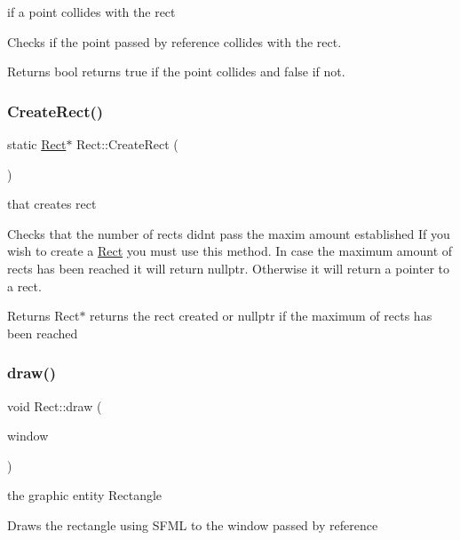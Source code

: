 if a point collides with the rect

Checks if the point passed by reference collides with the rect.

\begin{DoxyReturn}{Returns}
bool returns true if the point collides and false if not. 
\end{DoxyReturn}
\mbox{\label{class_rect_ac9283327c926d453d0cd5a49ded8d150}} 
\subsubsection{\texorpdfstring{Create\+Rect()}{CreateRect()}}
{\footnotesize\ttfamily static \hyperlink{class_rect}{Rect}$\ast$ Rect\+::\+Create\+Rect (\begin{DoxyParamCaption}{ }\end{DoxyParamCaption})\hspace{0.3cm}{\ttfamily [static]}}

that creates rect

Checks that the number of rects didn\textquotesingle{}t pass the maxim amount established If you wish to create a \hyperlink{class_rect}{Rect} you must use this method. In case the maximum amount of rects has been reached it will return nullptr. Otherwise it will return a pointer to a rect.

\begin{DoxyReturn}{Returns}
Rect$\ast$ returns the rect created or nullptr if the maximum of rects has been reached 
\end{DoxyReturn}
\mbox{\label{class_rect_aa131d780f6ebb75e9057c01221486adc}} 
\subsubsection{\texorpdfstring{draw()}{draw()}}
{\footnotesize\ttfamily void Rect\+::draw (\begin{DoxyParamCaption}\item[{sf\+::\+Render\+Window \&}]{window }\end{DoxyParamCaption})}

the graphic entity Rectangle

Draws the rectangle using S\+F\+ML to the window passed by reference

